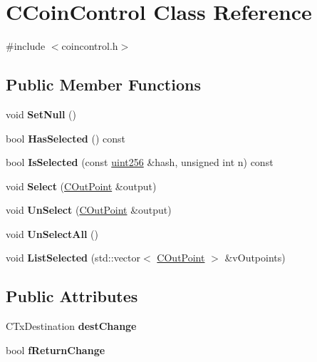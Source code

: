 \hypertarget{class_c_coin_control}{}\section{C\+Coin\+Control Class Reference}
\label{class_c_coin_control}


{\ttfamily \#include $<$coincontrol.\+h$>$}

\subsection*{Public Member Functions}
\begin{DoxyCompactItemize}
\item 
\mbox{\label{class_c_coin_control_aadca0a9e82e1e6d84dff4649e1d29d31}} 
void {\bfseries Set\+Null} ()
\item 
\mbox{\label{class_c_coin_control_a20b259681a7c62b2119256a4862091ac}} 
bool {\bfseries Has\+Selected} () const
\item 
\mbox{\label{class_c_coin_control_adcd674d510015f3212e489ab6bd74067}} 
bool {\bfseries Is\+Selected} (const \mbox{\hyperlink{classuint256}{uint256}} \&hash, unsigned int n) const
\item 
\mbox{\label{class_c_coin_control_a0c6d66b747f1e9531afa32a8bb851ba0}} 
void {\bfseries Select} (\mbox{\hyperlink{class_c_out_point}{C\+Out\+Point}} \&output)
\item 
\mbox{\label{class_c_coin_control_a28843122428b30c81814e54b9a0bcaa6}} 
void {\bfseries Un\+Select} (\mbox{\hyperlink{class_c_out_point}{C\+Out\+Point}} \&output)
\item 
\mbox{\label{class_c_coin_control_a78bc21b1698e6ae5e6c2fef9758db39c}} 
void {\bfseries Un\+Select\+All} ()
\item 
\mbox{\label{class_c_coin_control_a176b3a32b5f623fe25b8e61ca561422e}} 
void {\bfseries List\+Selected} (std\+::vector$<$ \mbox{\hyperlink{class_c_out_point}{C\+Out\+Point}} $>$ \&v\+Outpoints)
\end{DoxyCompactItemize}
\subsection*{Public Attributes}
\begin{DoxyCompactItemize}
\item 
\mbox{\label{class_c_coin_control_aa991ffd830267f6c2103fa7e03213f41}} 
C\+Tx\+Destination {\bfseries dest\+Change}
\item 
\mbox{\label{class_c_coin_control_a6fa813b53451a9933284030e1aa34a07}} 
bool {\bfseries f\+Return\+Change}
\end{DoxyCompactItemize}


